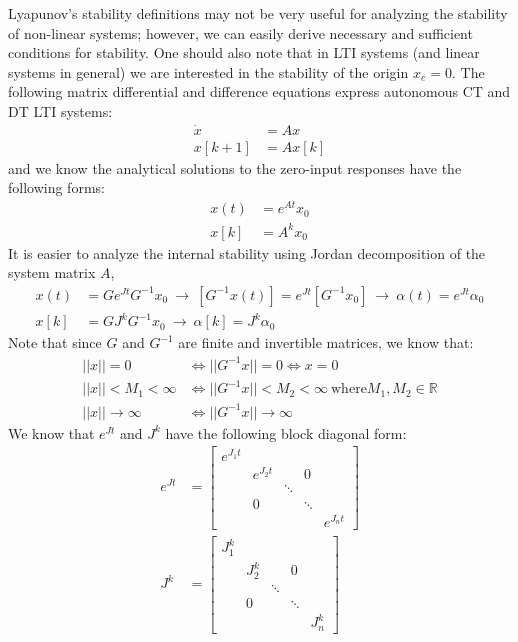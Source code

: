 \documentclass[twoside, 11pt]{article}
\begin{document}
Lyapunov's stability definitions may not be very useful for analyzing
the stability of non-linear systems; however, we can easily derive
necessary and sufficient conditions for stability. One should also note that 
in LTI systems (and linear systems in general) we are interested in the
stability of the origin $x_e = 0$. The following matrix differential and difference equations express autonomous CT and DT LTI systems:
%
\begin{align*}
\dot{x} &= A x 
\\
x[k+1] &= A x[k]
\end{align*}
%
and we know the analytical solutions to the zero-input responses have the following forms:
%
\begin{align*}
x(t) &= e^{A t} x_0
\\
x[k] &= A^k x_0
\end{align*}
%
It is easier to analyze the internal stability using Jordan decomposition of the system matrix $A$, 
%
\begin{align*}
x(t) &= G e^{J t} G^{-1} x_0 \ \rightarrow \  \left[ G^{-1} x(t) \right] = e^{J t} \left[ G^{-1} x_0 \right] \ \rightarrow \ \alpha(t) = e^{J t} \alpha_0
\\
x[k] &= G J^k G^{-1} x_0  \ \rightarrow \ \alpha[k] = J^k \alpha_0
\end{align*}
%
Note that since $G$ and $G^{-1}$ are finite and invertible matrices, we know that:
%
\begin{align*}
|| x || = 0 &\iff || G^{-1} x || = 0 \iff x = 0 
\\
|| x || < M_1 < \infty &\iff || G^{-1} x || < M_2 < \infty \ \mathrm{where} M_1 , M_2 \in \mathbb{R}
\\
|| x || \to \infty &\iff || G^{-1} x || \to \infty 
\end{align*}
%
We know that $e^{J t}$ and $J^k$ have the following block diagonal form:
%
\begin{align*}
e^{J t} &= \left[ \begin{array}{ccccc} e^{J_1 t} &  & & &  \\  & e^{J_2 t}  &  & 0 &  \\ &  & \ddots & \\ & 0 & & \ddots & \\ & &  & &  e^{J_n t}  \end{array} \right]
\\
J^k &= \left[ \begin{array}{ccccc} J_1^k &  & & &  \\  & J_2^k  &  & 0 &  \\ &  & \ddots & \\ & 0 & & \ddots & \\ & &  & &  J_n^k  \end{array} \right]
\end{align*}
\end{document}
